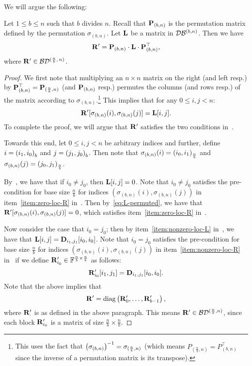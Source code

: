 We will argue the following:
\begin{theorem}\label{thm:lr_permutation} Let $1\le b\le n$ such that $b$ divides $n$.
Recall that $\mathbf{P}_{(b,n)}$ is the permutation matrix defined by the permutation $\sigma_{(b,n)}$. Let $\mathbf{L}$ be a matrix in $\mathcal{D}\mathcal{B}^{(b, n)}$. Then we have
\[\mathbf{R}'=\mathbf{P}_{(b,n)}\cdot\mathbf{L}\cdot\mathbf{P}_{(b,n)}^\top,\]
where $\mathbf{R}' \in \mathcal{B}\mathcal{D}^{(\frac{n}{b},\, n)}$.
\end{theorem}

\begin{proof}
We first note that multiplying an $n\times n$ matrix on the right (and left resp.) by $\mathbf{P}_{(b,n)}^\top = \mathbf{P}_{(\frac nb,n)}$ (and $\mathbf{P}_{(b,n)}$ resp.) permutes the columns (and rows resp.) of the matrix according to $\sigma_{(b,n)}$.\footnote{This uses the fact that $\left( {\sigma_{(b,n)}}\right)^{-1}=\sigma_{(\frac nb,n)}$ (which means $P_{(\frac{n}{b}, n)} = P_{(b, n)}^\top$ since the inverse of a permutation matrix is its transpose).} This implies that for any $0\le i,j<n$:
\begin{equation}
\label{eq:L-permuted}
\mathbf{R}'[\sigma_{(b,n)}(i),\sigma_{(b,n)}(j)]=\mathbf{L}[i,j].
\end{equation}
To complete the proof, we will argue that $\mathbf{R}'$ satisfies the two conditions in~.

Towards this end, let $0\le i,j<n$ be arbitrary indices and further, define $i=\left( {{i_1},{i_0}}\right)_{{b}}$ and $j=\left( {{j_1},{j_0}}\right)_{{b}}$. Then note that $\sigma_{(b,n)}(i)=\left( {{i_0},{i_1}}\right)_{{\frac nb}}$ and $\sigma_{(b,n)}(j)=\left( {{j_0},{j_1}}\right)_{{\frac nb}}$.

By~, we have that if $i_0\ne j_0$, then $\mathbf{L}[i,j]=0$. Note that $i_0\ne j_0$ satisfies the pre-condition for base size $\frac nb$ for indices $(\sigma_{(b,n)}(i),\sigma_{(b,n)}(j))$ in item~\ref{item:zero-loc-R} in~.  Then   by~\cref{eq:L-permuted}, we have that $\mathbf{R}'[\sigma_{(b,n)}(i),\sigma_{(b,n)}(j)]=0$, which satisfies item~\ref{item:zero-loc-R} in~.

Now consider the case that $i_0=j_0$; then by item~\ref{item:nonzero-loc-L} in~, we have that $\mathbf{L}[i,j]=\mathbf{D}_{i_1,j_1}[i_0,i_0]$.  Note that $i_0= j_0$ satisfies the pre-condition for base size $\frac nb$ for indices $(\sigma_{(b,n)}(i),\sigma_{(b,n)}(j))$ in item~\ref{item:nonzero-loc-R} in~ if we define $\mathbf{R}'_{i_0}\in\mathbb{F}^{\frac nb\times\frac nb}$ as follows:
\[\mathbf{R}'_{i_0}[i_1,j_1]=\mathbf{D}_{i_1,j_1}[i_0,i_0].\] 
Note that the above implies that 
\[\mathbf{R}'=\mathrm{diag}\left( {\mathbf{R}'_0,\dots,\mathbf{R}'_{b-1}}\right),\]
where $\mathbf{R}'_{\cdot}$ is as defined in the above paragraph. This means $\mathbf{R}' \in \mathcal{B}\mathcal{D}^{(\frac{n}{b}, n)}$, since each block $\mathbf{R}_{i_0}'$ is a matrix of size $\frac{n}{b} \times \frac{n}{b}$.
\end{proof}

